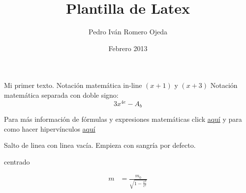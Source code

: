 \documentclass[12pt]{article}
\title{Plantilla de Latex}
\author{Pedro Iván Romero Ojeda}
\date{Febrero 2013}
\begin{document}
\maketitle
Mi primer texto. Notación matemática in-line $(x+1)$ y $(x+3)$ Notación matemática separada con doble signo: $$3x^{4e} - A_b$$

Para más información de fórmulas y expresiones matemáticas click \href{http://en.wikibooks.org/wiki/LaTeX/Mathematics}{aquí} y para como hacer hipervínculos \href{http://en.wikibooks.org/wiki/LaTeX/Hyperlinks}{aquí}

Salto de linea con linea vacía. Empieza con sangría por defecto.
\begin{center}
centrado %
\end{center}

\begin{align}
m &= \frac{m_0}{\sqrt{1-\frac{v^2}{c^2}}}
\end{align}
\end{document}
